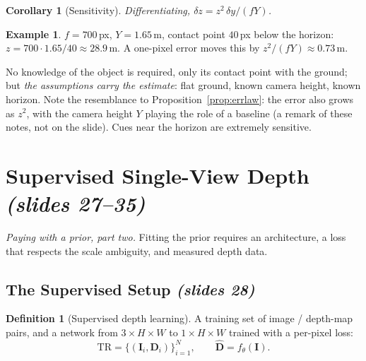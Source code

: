 \documentclass[11pt,a4paper]{article}
\numberwithin{equation}{section}
\newcommand{\slides}[1]{\texorpdfstring{\;\emph{(slides #1)}}{ (slides #1)}}
\theoremstyle{plain}
\newtheorem{corollary}[theorem]{Corollary}
\theoremstyle{definition}
\newtheorem{definition}[theorem]{Definition}
\newtheorem{example}[theorem]{Example}
\begin{document}
\begin{corollary}[Sensitivity]
Differentiating, $\delta z=z^2\,\delta y/(fY)$.
\end{corollary}
 
\begin{example}
$f=700$\,px, $Y=1.65$\,m, contact point $40$\,px below the horizon: $z=700\cdot1.65/40\approx28.9$\,m. A one-pixel error moves this by $z^2/(fY)\approx0.73$\,m.
\end{example}
 
\begin{intuition}
No knowledge of the object is required, only its contact point with the ground; but \emph{the assumptions carry the estimate}: flat ground, known camera height, known horizon. Note the resemblance to Proposition~\ref{prop:errlaw}: the error also grows as $z^2$, with the camera height $Y$ playing the role of a baseline (a remark of these notes, not on the slide). Cues near the horizon are extremely sensitive.
\end{intuition}
 
\section{Supervised Single-View Depth \slides{27--35}}
\emph{Paying with a prior, part two.} Fitting the prior requires an architecture, a loss that respects the scale ambiguity, and measured depth data.
 
\subsection{The Supervised Setup \slides{28}}
 
\begin{definition}[Supervised depth learning]
A training set of image / depth-map pairs, and a network from $3\times H\times W$ to $1\times H\times W$ trained with a per-pixel loss:
\[
\mathrm{TR}=\{(\bm I_i,\bm D_i)\}_{i=1}^{N},\qquad \hat{\bm D}=f_\theta(\bm I).
\]
\end{definition}
 
\end{document}
